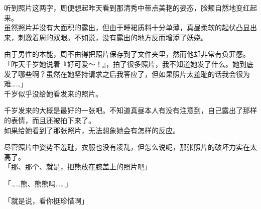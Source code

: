 听到照片这两字，周便想起昨天看到那清秀中带点美艳的姿态，脸颊自然地变红起来。\\

虽然照片并没有大面积的露出，但由于睡裙质料十分单薄，真昼柔软的起伏凸显出来，刺激着周的双眼。不如说，没有露出的地方反而增添了妖娆。

由于男性的本能，周不由得把照片保存到了文件夹里，然而他却非常有负罪感。\\

「昨天千岁她说着『好可爱～！』，拍了很多照片，我不知道她发了什么。她到底发了哪些啊？虽然在她坚持请求之后我答应了，但如果照片太羞耻的话我会很为难……」\\

千岁似乎没给她看发来的照片。

千岁发来的大概是最好的一张吧。不知道真昼本人有没有注意到，自己露出了那样的表情，而且还被拍下来了。\\

如果给她看到了那张照片，无法想象她会有怎样的反应。

尽管照片中姿势不羞耻，衣服也没有凌乱，但怎么说呢，那张照片的破坏力实在太高了。\\

「那、那个、就是，把熊放在膝盖上的照片吧」

「……熊、熊熊吗……」

「就是说，看你挺珍惜啊」\\

